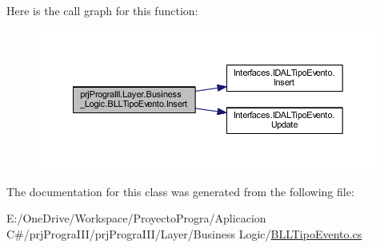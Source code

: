 Here is the call graph for this function\+:
\nopagebreak
\begin{figure}[H]
\begin{center}
\leavevmode
\includegraphics[width=350pt]{classprj_progra_i_i_i_1_1_layer_1_1_business___logic_1_1_b_l_l_tipo_evento_a3edf9ef41a8df3294c6765b55338a750_cgraph}
\end{center}
\end{figure}


The documentation for this class was generated from the following file\+:\begin{DoxyCompactItemize}
\item 
E\+:/\+One\+Drive/\+Workspace/\+Proyecto\+Progra/\+Aplicacion C\#/prj\+Progra\+I\+I\+I/prj\+Progra\+I\+I\+I/\+Layer/\+Business Logic/\hyperlink{_b_l_l_tipo_evento_8cs}{B\+L\+L\+Tipo\+Evento.\+cs}\end{DoxyCompactItemize}
